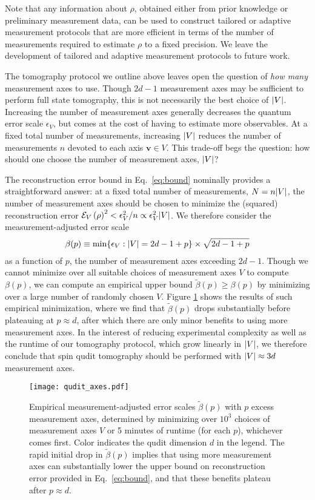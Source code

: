 \documentclass[notitlepage,twocolumn]{revtex4-2}
\newcommand{\p}[1]{\left(#1\right)} %
\renewcommand{\v}{\bm} %
\renewcommand{\set}[1]{\{#1\}} %
\newcommand{\E}{\mathcal{E}}
\begin{document}
Note that any information about $\rho$, obtained either from prior knowledge or preliminary measurement data, can be used to construct tailored or adaptive measurement protocols \cite{pereira2018adaptive} that are more efficient in terms of the number of measurements required to estimate $\rho$ to a fixed precision.
We leave the development of tailored and adaptive measurement protocols to future work.

The tomography protocol we outline above leaves open the question of {\it how many} measurement axes to use.
Though $2d-1$ measurement axes may be sufficient to perform full state tomography, this is not necessarily the best choice of $\abs{V}$.
Increasing the number of measurement axes generally decreases the quantum error scale $\epsilon_V$, but comes at the cost of having to estimate more observables.
At a fixed total number of measurements, increasing $\abs{V}$ reduces the number of measurements $n$ devoted to each axis $\v v\in V$.
This trade-off begs the question: how should one choose the number of measurement axes, $\abs{V}$?

The reconstruction error bound in Eq.~\eqref{eq:bound} nominally provides a straightforward answer: at a fixed total number of measurements, $N=n\abs{V}$, the number of measurement axes should be chosen to minimize the (squared) reconstruction error $\E_V\p{\rho}^2<\epsilon_V^2/n\propto\epsilon_V^2\abs{V}$.
We therefore consider the measurement-adjusted error scale
\begin{align}
  \beta(p)
  \equiv \min\set{\epsilon_V:\abs{V}=2d-1+p} \times \sqrt{2d-1+p}
\end{align}
as a function of $p$, the number of measurement axes exceeding $2d-1$.
Though we cannot minimize over all suitable choices of measurement axes $V$ to compute $\beta(p)$, we can compute an empirical upper bound $\tilde\beta(p)\ge\beta(p)$ by minimizing over a large number of randomly chosen $V$.
Figure \ref{fig:axes} shows the results of such empirical minimization, where we find that $\tilde\beta(p)$ drops substantially before plateauing at $p\approx d$, after which there are only minor benefits to using more measurement axes.
In the interest of reducing experimental complexity as well as the runtime of our tomography protocol, which grow linearly in $\abs{V}$, we therefore conclude that spin qudit tomography should be performed with $\abs{V}\approx3d$ measurement axes.

\begin{figure}[hb]
  \centering
  \texttt{[image: qudit\_axes.pdf]}
  \caption{Empirical measurement-adjusted error scales $\tilde\beta(p)$ with $p$ excess measurement axes, determined by minimizing over $10^3$ choices of measurement axes $V$ or 5 minutes of runtime (for each $p$), whichever comes first.
    Color indicates the qudit dimension $d$ in the legend.
    The rapid initial drop in $\tilde\beta(p)$ implies that using more measurement axes can substantially lower the upper bound on reconstruction error provided in Eq.~\eqref{eq:bound}, and that these benefits plateau after $p\approx d$.}
  \label{fig:axes}
\end{figure}
\end{document}
